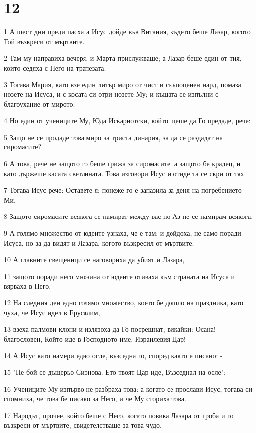 \chapter{12}

\par 1 А шест дни преди пасхата Исус дойде във Витания, където беше Лазар, когото Той възкреси от мъртвите.
\par 2 Там му направиха вечеря, и Марта прислужваше; а Лазар беше един от тия, които седяха с Него на трапезата.
\par 3 Тогава Мария, като взе един литър миро от чист и скъпоценен нард, помаза нозете на Исуса, и с косата си отри нозете Му; и къщата се изпълни с благоухание от мирото.
\par 4 Но един от учениците Му, Юда Искариотски, който щеше да Го предаде, рече:
\par 5 Защо не се продаде това миро за триста динария, за да се раздадат на сиромасите?
\par 6 А това, рече не защото го беше грижа за сиромасите, а защото бе крадец, и като държеше касата светлината. Това изговори Исус и отиде та се скри от тях.
\par 7 Тогава Исус рече: Оставете я; понеже го е запазила за деня на погребението Ми.
\par 8 Защото сиромасите всякога се намират между вас но Аз не се намирам всякога.
\par 9 А голямо множество от юдеите узнаха, че е там; и дойдоха, не само поради Исуса, но за да видят и Лазара, когото възкресил от мъртвите.
\par 10 А главните свещеници се наговориха да убият и Лазара,
\par 11 защото поради него мнозина от юдеите отиваха към страната на Исуса и вярваха в Него.
\par 12 На следния ден едно голямо множество, което бе дошло на праздника, като чуха, че Исус идел в Ерусалим,
\par 13 взеха палмови клони и излязоха да Го посрещнат, викайки: Осана! благословен, Който иде в Господното име, Израилевия Цар!
\par 14 А Исус като намери едно осле, възседна го, според както е писано: -
\par 15 "Не бой се дъщерьо Сионова. Ето твоят Цар иде, Възседнал на осле";
\par 16 Учениците Му изпърво не разбраха това: а когато се прослави Исус, тогава си спомниха, че това бе писано за Него, и че Му сториха това.
\par 17 Народът, прочее, който беше с Него, когато повика Лазара от гроба и го възкреси от мъртвите, свидетелстваше за това чудо.
